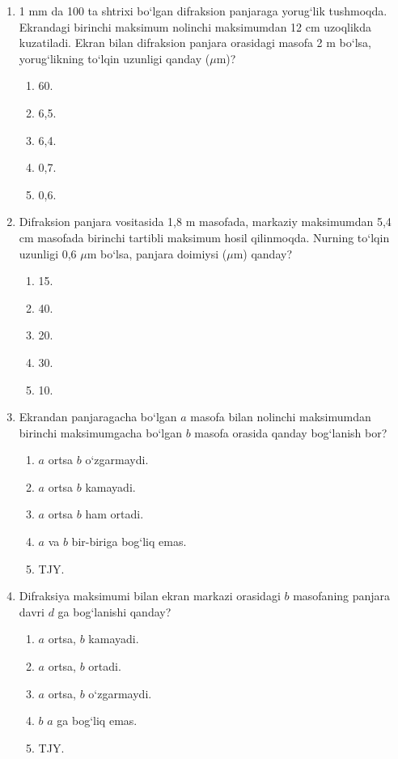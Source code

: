 \begin{enumerate}
\item 1 mm da 100 ta shtrixi bo‘lgan difraksion panjaraga yorug‘lik tushmoqda. Ekrandagi birinchi maksimum nolinchi maksimumdan 12 cm uzoqlikda kuzatiladi. Ekran bilan difraksion panjara orasidagi masofa 2 m bo‘lsa, yorug‘likning to‘lqin uzunligi qanday ($\mu$m)?
\begin{enumerate}[label=\Alph*)]
\item 60.
\item 6,5.
\item 6,4.
\item 0,7.
\item 0,6.
\end{enumerate}

\item Difraksion panjara vositasida 1,8 m masofada, markaziy maksimumdan 5,4 cm masofada birinchi tartibli maksimum hosil qilinmoqda. Nurning to‘lqin uzunligi 0,6 $\mu$m bo‘lsa, panjara doimiysi ($\mu$m) qanday?
\begin{enumerate}[label=\Alph*)]
\item 15.
\item 40.
\item 20.
\item 30.
\item 10.
\end{enumerate}


\item Ekrandan panjaragacha bo‘lgan $a$ masofa bilan nolinchi maksimumdan birinchi maksimumgacha bo‘lgan $b$ masofa orasida qanday bog‘lanish bor?
\begin{enumerate}[label=\Alph*)]
\item $a$ ortsa $b$ o‘zgarmaydi.
\item $a$ ortsa $b$ kamayadi.
\item $a$ ortsa $b$ ham ortadi.
\item $a$ va $b$ bir-biriga bog‘liq emas.
\item TJY.
\end{enumerate}

\item Difraksiya maksimumi bilan ekran markazi orasidagi $b$ masofaning panjara davri $d$ ga bog‘lanishi qanday?
\begin{enumerate}[label=\Alph*)]
\item $a$ ortsa, $b$ kamayadi.
\item $a$ ortsa, $b$ ortadi.
\item $a$ ortsa, $b$ o‘zgarmaydi.
\item $b$ $a$ ga bog‘liq emas.
\item TJY.
\end{enumerate}


\end{enumerate}

